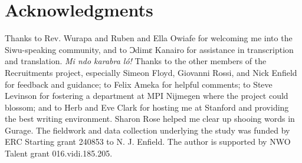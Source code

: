 \documentclass[output=paper]{langsci/langscibook}
\begin{document}
\section*{Acknowledgments}
Thanks to Rev. Wurapa and Ruben and Ella Owiafe for welcoming me into the Siwu-speaking community, and to Ɔdimɛ Kanairo for assistance in transcription and translation. \textit{Mi ndo karabra ló!} Thanks to the other members of the Recruitments project, especially Simeon Floyd, Giovanni Rossi, and Nick Enfield for feedback and guidance; to Felix Ameka for helpful comments; to Steve Levinson for fostering a department at MPI Nijmegen where the project could blossom; and to Herb and Eve Clark for hosting me at Stanford and providing the best writing environment. Sharon Rose helped me clear up shooing words in Gurage. The fieldwork and data collection underlying the study was funded by ERC Starting grant 240853 to N. J. Enfield. The author is supported by NWO Talent grant 016.vidi.185.205.


\sloppy
\printbibliography[heading=subbibliography,notkeyword=this]
\end{document}
